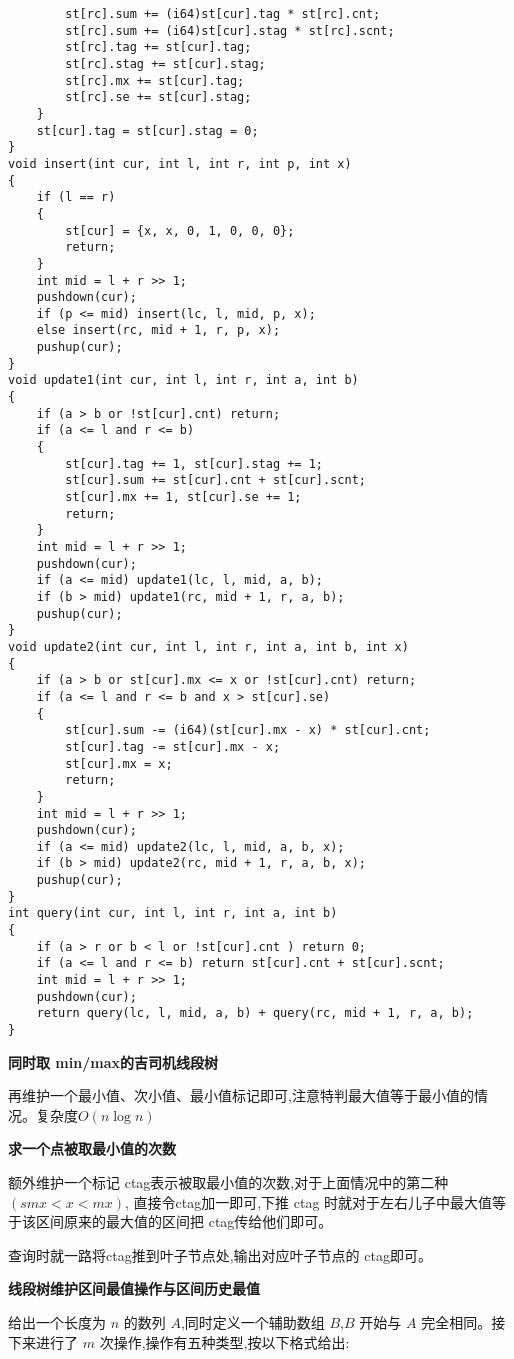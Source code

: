 \documentclass[a4paper]{ctexart}
\begin{document}
\begin{lstlisting}
        st[rc].sum += (i64)st[cur].tag * st[rc].cnt;
        st[rc].sum += (i64)st[cur].stag * st[rc].scnt;
        st[rc].tag += st[cur].tag;
        st[rc].stag += st[cur].stag;
        st[rc].mx += st[cur].tag;
        st[rc].se += st[cur].stag;
    }
    st[cur].tag = st[cur].stag = 0;
}
void insert(int cur, int l, int r, int p, int x)
{
    if (l == r)
    {
        st[cur] = {x, x, 0, 1, 0, 0, 0};
        return;
    }
    int mid = l + r >> 1;
    pushdown(cur);
    if (p <= mid) insert(lc, l, mid, p, x);
    else insert(rc, mid + 1, r, p, x);
    pushup(cur);
}
void update1(int cur, int l, int r, int a, int b)
{
    if (a > b or !st[cur].cnt) return;
    if (a <= l and r <= b)
    {
        st[cur].tag += 1, st[cur].stag += 1;
        st[cur].sum += st[cur].cnt + st[cur].scnt;
        st[cur].mx += 1, st[cur].se += 1;
        return;
    }
    int mid = l + r >> 1;
    pushdown(cur);
    if (a <= mid) update1(lc, l, mid, a, b);
    if (b > mid) update1(rc, mid + 1, r, a, b);
    pushup(cur);
}
void update2(int cur, int l, int r, int a, int b, int x)
{
    if (a > b or st[cur].mx <= x or !st[cur].cnt) return;
    if (a <= l and r <= b and x > st[cur].se)
    {
        st[cur].sum -= (i64)(st[cur].mx - x) * st[cur].cnt;
        st[cur].tag -= st[cur].mx - x;
        st[cur].mx = x;
        return;
    }
    int mid = l + r >> 1;
    pushdown(cur);
    if (a <= mid) update2(lc, l, mid, a, b, x);
    if (b > mid) update2(rc, mid + 1, r, a, b, x);
    pushup(cur);
}
int query(int cur, int l, int r, int a, int b)
{
    if (a > r or b < l or !st[cur].cnt ) return 0;
    if (a <= l and r <= b) return st[cur].cnt + st[cur].scnt;
    int mid = l + r >> 1;
    pushdown(cur);
    return query(lc, l, mid, a, b) + query(rc, mid + 1, r, a, b);
}
\end{lstlisting}

\textbf{同时取 min/max的吉司机线段树}

再维护一个最小值、次小值、最小值标记即可,注意特判最大值等于最小值的情况。复杂度$O(n\log n)$

\textbf{求一个点被取最小值的次数}

额外维护一个标记 ctag表示被取最小值的次数,对于上面情况中的第二种$(smx<x<mx)$,
直接令ctag加一即可,下推 ctag 时就对于左右儿子中最大值等于该区间原来的最大值的区间把 
ctag传给他们即可。

查询时就一路将ctag推到叶子节点处,输出对应叶子节点的 ctag即可。

\textbf{线段树维护区间最值操作与区间历史最值}

给出一个长度为 $n$ 的数列 $A$,同时定义一个辅助数组 $B$,$B$ 开始与 $A$ 完全相同。接下来进行了 $m$ 次操作,操作有五种类型,按以下格式给出:
\end{document}

